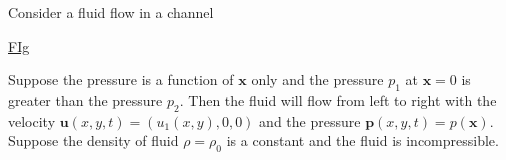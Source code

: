 
Consider a fluid flow in a channel

\underline{FIg}

Suppose the pressure is a function of $\textbf{x}$ only and the pressure $p_1$ at $\textbf{x}=0$ is greater than the pressure $p_2$. Then the fluid will flow from left to right with the velocity $\textbf{u}(x,y,t) = (u_1(x,y),0,0)$ and the pressure $\textbf{p}(x,y,t) = p(\textbf{x})$. Suppose the density of fluid $\rho=\rho_0$ is a constant  and the fluid is incompressible.






